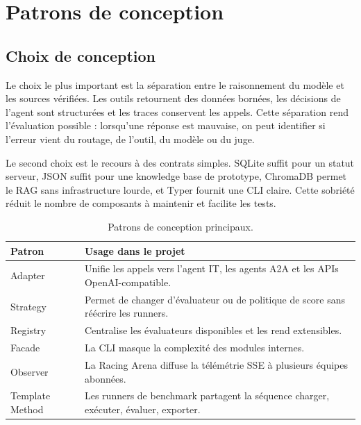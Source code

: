 
\chapter{Patrons de conception}

\section{Choix de conception}

Le choix le plus important est la séparation entre le raisonnement du modèle et
les sources vérifiées. Les outils retournent des données bornées, les décisions
de l'agent sont structurées et les traces conservent les appels. Cette
séparation rend l'évaluation possible : lorsqu'une réponse est mauvaise, on peut
identifier si l'erreur vient du routage, de l'outil, du modèle ou du juge.

Le second choix est le recours à des contrats simples. SQLite suffit pour un
statut serveur, JSON suffit pour une knowledge base de prototype, ChromaDB
permet le RAG sans infrastructure lourde, et Typer fournit une CLI claire. Cette
sobriété réduit le nombre de composants à maintenir et facilite les tests.

\begin{table}[!htbp]
\centering
\begin{tabularx}{\textwidth}{lY}
\toprule
\textbf{Patron} & \textbf{Usage dans le projet} \\
\midrule
Adapter & Unifie les appels vers l'agent IT, les agents A2A et les APIs OpenAI-compatible. \\
Strategy & Permet de changer d'évaluateur ou de politique de score sans réécrire les runners. \\
Registry & Centralise les évaluateurs disponibles et les rend extensibles. \\
Facade & La CLI  masque la complexité des modules internes. \\
Observer & La Racing Arena diffuse la télémétrie SSE à plusieurs équipes abonnées. \\
Template Method & Les runners de benchmark partagent la séquence charger, exécuter, évaluer, exporter. \\
\bottomrule
\end{tabularx}
\caption{Patrons de conception principaux.}
\label{tab:patterns}
\end{table}


